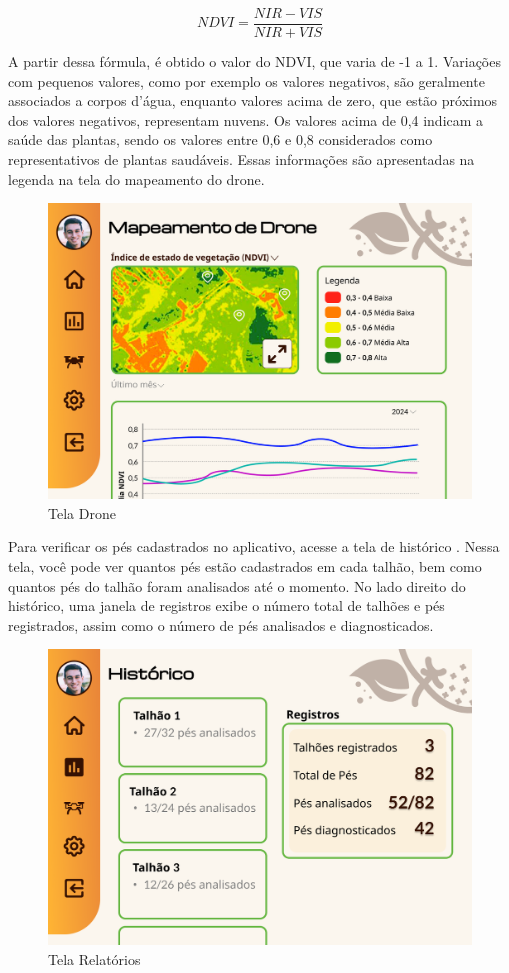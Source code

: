 \documentclass[
  a4paper,%
  12pt,%
  english,%
  brazilian,%
]{article}
\begin{document}
\[ NDVI =  \frac{NIR - VIS}{NIR + VIS} \]

A partir dessa fórmula, é obtido o valor do NDVI, que varia de -1 a 1. Variações com pequenos valores, como por exemplo os valores negativos, são geralmente associados a corpos d'água, enquanto valores acima de zero, que estão próximos dos valores negativos, representam nuvens. Os valores acima de 0,4 indicam a saúde das plantas, sendo os valores entre 0,6 e 0,8 considerados como representativos de plantas saudáveis. Essas informações são apresentadas na legenda na tela do mapeamento do drone.

\begin{figure}[H]
\centering
\caption{Tela Drone}%
\label{fig:tela-drone}
\includegraphics[width=0.8\linewidth]{Logos/tela-drone.png}
\end{figure}

Para verificar os pés cadastrados no aplicativo, acesse a tela de histórico . Nessa tela, você pode ver quantos pés estão cadastrados em cada talhão, bem como quantos pés do talhão foram analisados até o momento. No lado direito do histórico, uma janela de registros exibe o número total de talhões e pés registrados, assim como o número de pés analisados e diagnosticados.

\begin{figure}[H]
\centering
\caption{Tela Relatórios}%
\label{fig:tela-relatorios}
\includegraphics[width=0.8\linewidth]{Logos/tela-relatorios.png}
\end{figure}
\end{document}
